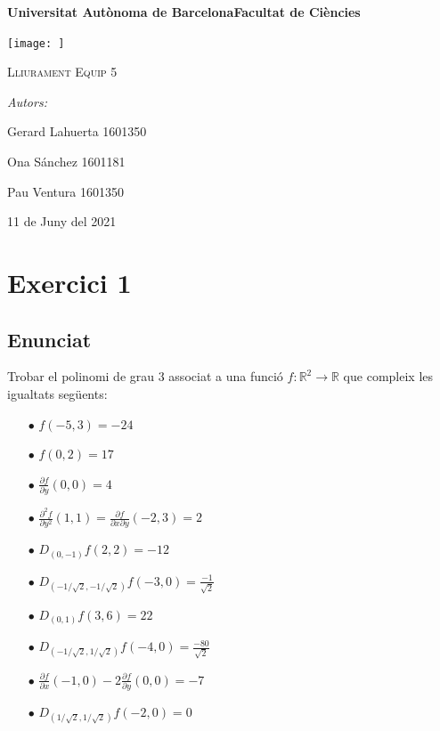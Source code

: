 \documentclass[12pt]{report}
\begin{document}
\begin{titlepage}
    \centering
    {\bfseries\LARGE Universitat Autònoma de Barcelona\newline Facultat de Ciències\par}
    \vspace{2cm}
    {\hspace{-1em}\texttt{[image: ]}\par}
    \vspace{1cm}
    {\scshape\Huge Lliurament Equip 5 \par} 
    \vspace{1cm}
    {\Large \itshape Autors: \par}
    {\large Gerard Lahuerta 1601350\par}
    {\large Ona Sánchez 1601181 \par}
    {\large Pau Ventura 1601350 \par}
    \vspace{1cm}
    {\Large 11 de Juny del 2021\par}
\end{titlepage}

\justifying


\newpage
\setcounter{page}{2}
\pagestyle{plain}
\tableofcontents
\cleardoublepage
{}




\chapter{Exercici 1}
\section{Enunciat}
Trobar el polinomi de grau 3 associat a una funció $f: \mathbb{R}^2 \to \mathbb{R}$ que compleix les igualtats següents:
\begin{itemize}
    \item [$\bullet$] $ f(-5,3)=-24 $
    \item [$\bullet$] $ f(0,2)=17 $
    \item [$\bullet$] $ \frac{\partial f}{\partial y}(0,0) =4 $
    \item [$\bullet$] $ \frac{\partial^2 f}{\partial y^2}(1,1) = \frac{\partial f}{\partial x \partial y}(-2,3) = 2 $
    \item [$\bullet$] $ D_{(0,-1)}f(2,2)=-12 $
    \item [$\bullet$] $ D_{(-1/\sqrt{2},-1/\sqrt{2})}f(-3,0)= \frac{-1}{\sqrt{2}} $
    \item [$\bullet$] $ D_{(0,1)}f(3,6)=22 $
    \item [$\bullet$] $ D_{(-1/\sqrt{2},1/\sqrt{2})}f(-4,0)=\frac{-80}{\sqrt{2}} $
    \item [$\bullet$] $ \frac{\partial f}{\partial x}(-1,0) - 2\frac{\partial f}{\partial y}(0,0) =-7 $
    \item [$\bullet$] $ D_{(1/\sqrt{2},1/\sqrt{2})}f(-2,0)=0 $
\end{itemize}
\end{document}

